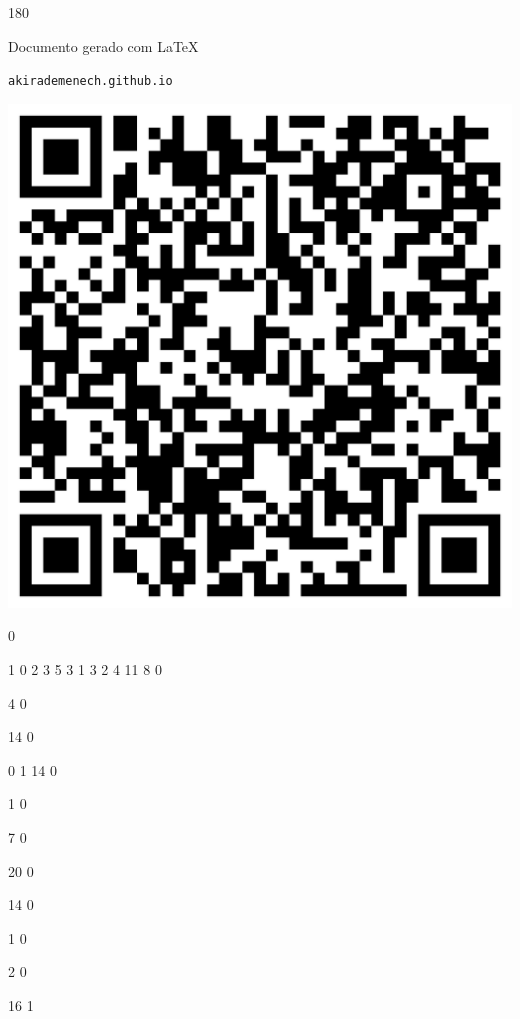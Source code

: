 \documentclass[12pt]{article}
\begin{document}
	\begin{turn}{180}	
		\begin{minipage}{\textwidth}		  
		  Documento gerado com \LaTeX			
		  
		  \texttt{akirademenech.github.io}

		  \includegraphics[height=0.3\textheight]{2e-2.pdf}

		\end{minipage}	
	\end{turn}  
		  
		\vfill  
		  
{
	0	%

	1	%
	0	%
	2	%
	3	%
	5	%
	3	%
	1	%
	3	%
	2	%
	4	%
	11	%
	8	%
	0	%

	4	%
	0	%

	14	%
	0	%

	0	%
	1	%
	14	%
	0	%

	1	%
	0	%

	7	%
	0	%

	20	%
	0	%

	14	%
	0	%

	1	%
	0	%

	2	%
	0	%

	16	%
	1	%
}	  
		    	
\end{document}
